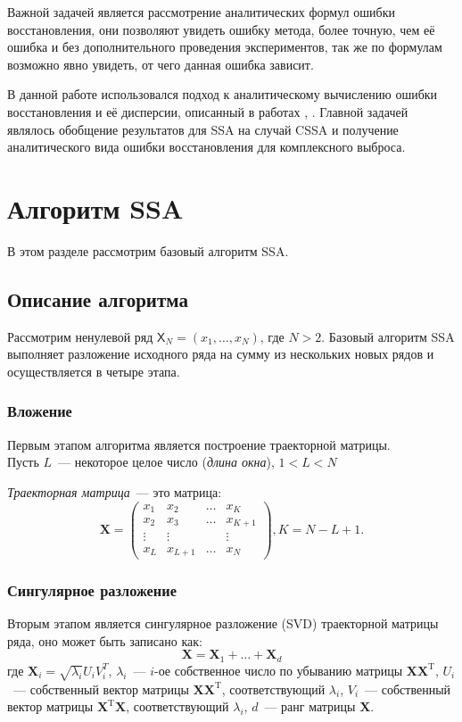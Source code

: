 \documentclass[specialist,
               substylefile = spbu.rtx,
               subf,href,colorlinks=true, 12pt]{disser}
\newcommand{\tX}[1]{\mathsf{#1}}
\begin{document}
Важной задачей является рассмотрение аналитических формул ошибки восстановления, они позволяют увидеть ошибку метода, более точную, чем её ошибка и без дополнительного проведения экспериментов, так же по формулам возможно явно увидеть, от чего данная ошибка зависит. 

В данной работе использовался подход к аналитическому вычислению ошибки восстановления и её дисперсии, описанный в работах \cite{Nekr2008}, \cite{Vlas2008}. Главной задачей являлось обобщение результатов для SSA на случай CSSA и получение аналитического вида ошибки восстановления для комплексного выброса.
 

\chapter{Алгоритм SSA}
В этом разделе рассмотрим базовый алгоритм SSA.
\section{Описание алгоритма}
Рассмотрим ненулевой ряд $\tX{X}_N = (x_1, \ldots, x_{N})$, где $N > 2$. Базовый алгоритм SSA выполняет разложение исходного ряда на сумму из нескольких новых рядов и осуществляется в четыре этапа. 
\subsection{Вложение}
Первым этапом алгоритма является построение траекторной матрицы.\\
Пусть $L$~--- некоторое целое число (\textit{длина окна}), $1 < L < N$

\textit{Траекторная матрица}~--- это матрица:
$$\mathbf{X} = \begin{pmatrix}
           x_1 & x_2 & \ldots & x_{K}\\
           x_2 & x_3 & \ldots & x_{K+1}\\
           \vdots & \vdots & & \vdots\\
           x_{L} & x_{L+1} & \ldots & x_{N}
         \end{pmatrix}, K = N - L + 1.$$
\subsection{Сингулярное разложение}
Вторым этапом является сингулярное разложение (SVD) траекторной матрицы ряда, оно может быть записано как:
$$\mathbf{X} = \mathbf{X}_1 + \ldots + \mathbf{X}_d$$
где $\mathbf{X}_i = \sqrt{\lambda_i}U_i V_i^T$, $\lambda_i$~--- $i$-ое собственное число по убыванию матрицы $\mathbf{X} \mathbf{X}^{\mathrm{T}}$, $U_i$~--- собственный вектор матрицы $\mathbf{X} \mathbf{X}^{\mathrm{T}}$, соответствующий $\lambda_i$, $V_i$~--- собственный вектор матрицы $\mathbf{X}^{\mathrm{T}} \mathbf{X}$, соответствующий $\lambda_i$, $d$~--- ранг матрицы $\mathbf{X}$.
\end{document}
